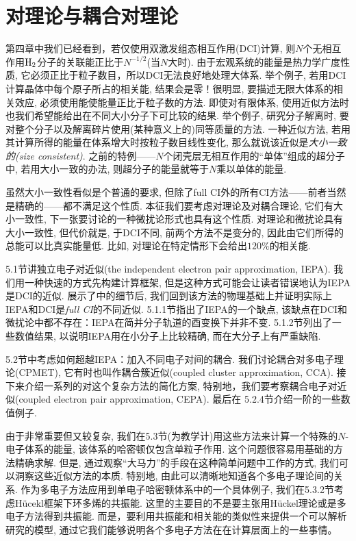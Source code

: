\chapter{对理论与耦合对理论}
第四章中我们已经看到，若仅使用双激发组态相互作用(DCI)计算, 则$N$个无相互作用$\mathrm{H}_2$分子的关联能正比于$N^{-1/2}$(当$N$大时). 由于宏观系统的能量是热力学广度性质, 它必须正比于粒子数目，所以DCI无法良好地处理大体系. 举个例子, 若用DCI计算晶体中每个原子所占的相关能, 结果会是零！很明显, 要描述无限大体系的相关效应, 必须使用能使能量正比于粒子数的方法. 即使对有限体系, 使用近似方法时也我们希望能给出在不同大小分子下可比较的结果. 举个例子, 研究分子解离时, 要对整个分子以及解离碎片使用(某种意义上的)同等质量的方法. 一种近似方法, 若用其计算所得的能量在体系增大时按粒子数目线性变化, 那么就说该近似是\emph{大小一致的(size consistent)}. 之前的特例——$N$个闭壳层无相互作用的``单体''组成的超分子中, 若用大小一致的办法, 则超分子的能量就等于$N$乘以单体的能量.

虽然大小一致性看似是个普通的要求, 但除了full CI外的所有CI方法——前者当然是精确的——都不满足这个性质. 本征我们要考虑对理论及对耦合理论, 它们有大小一致性, 下一张要讨论的一种微扰论形式也具有这个性质. 对理论和微扰论具有大小一致性, 但代价就是, 于DCI不同, 前两个方法不是变分的, 因此由它们所得的总能可以比真实能量低. 比如, 对理论在特定情形下会给出$120\%$的相关能.

5.1节讲独立电子对近似(the independent electron pair approximation, IEPA). 我们用一种快速的方式先构建计算框架, 但是这种方式可能会让读者错误地认为IEPA是DCI的近似. 展示了中的细节后, 我们回到该方法的物理基础上并证明实际上IEPA和DCI是\emph{full CI}的不同近似. 5.1.1节指出了IEPA的一个缺点, 该缺点在DCI和微扰论中都不存在：IEPA在简并分子轨道的酉变换下并非不变. 5.1.2节列出了一些数值结果, 以说明IEPA用在小分子上比较精确, 而在大分子上有严重缺陷.

5.2节中考虑如何超越IEPA：加入不同电子对间的耦合. 我们讨论耦合对多电子理论(CPMET), 它有时也叫作耦合簇近似(coupled cluster approximation, CCA). 接下来介绍一系列的对这个复杂方法的简化方案, 特别地，我们要考察耦合电子对近似(coupled electron pair approximation, CEPA). 最后在 5.2.4节介绍一阶的一些数值例子.

由于非常重要但又较复杂, 我们在5.3节(为教学计)用这些方法来计算一个特殊的$N$-电子体系的能量, 该体系的哈密顿仅包含单粒子作用. 这个问题很容易用基础的方法精确求解. 但是, 通过观察``大马力''的手段在这种简单问题中工作的方式, 我们可以洞察这些近似方法的本质. 特别地, 由此可以清晰地知道各个多电子理论间的关系. 作为多电子方法应用到单电子哈密顿体系中的一个具体例子, 我们在5.3.2节考虑H\"ucekl框架下环多烯的共振能. 这里的主要目的不是要主张用H\"uckel理论或是多电子方法得到共振能. 而是，要利用共振能和相关能的类似性来提供一个可以解析研究的模型, 通过它我们能够说明各个多电子方法在在计算层面上的一些事情。

